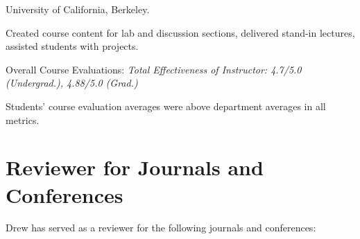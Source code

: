 \documentclass[letterpaper]{deedy-resume} %
\begin{document}
{{} University of California, Berkeley.
  
\begin{tightitemize}
\item Created course content for lab and discussion sections, delivered stand-in lectures, assisted students with projects.
\item Overall Course Evaluations: {\it Total Effectiveness of Instructor: 4.7/5.0 (Undergrad.), 4.88/5.0 (Grad.)}
\item Students' course evaluation averages were above department averages in all metrics.
\end{tightitemize}}

\vspace{0.2cm}


  


\section{Reviewer for Journals and Conferences}

\vspace{0.2cm}

Drew has served as a reviewer for the following journals and conferences:

\vspace{0.2cm}
\end{document}
